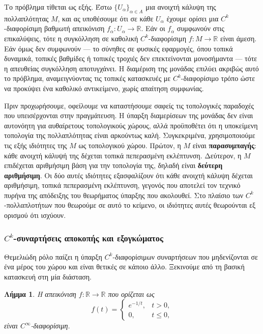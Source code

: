 \documentclass[11pt,a4paper,twoside,openright]{book}
\newtheorem{lemma}{Λήμμα}[section]
\begin{document}
Το πρόβλημα τίθεται ως εξής. Έστω $\{U_\alpha\}_{\alpha \in A}$ μια ανοιχτή κάλυψη της πολλαπλότητας $M$, και ας υποθέσουμε ότι σε κάθε $U_\alpha$ έχουμε ορίσει μια $C^k$-διαφορίσιμη βαθμωτή απεικόνιση $f_\alpha: U_\alpha \to \mathbb{R}$. Εάν οι $f_\alpha$ συμφωνούν στις επικαλύψεις, τότε η συγκόλληση σε καθολική $C^k$-διαφορίσιμη $f: M \to \mathbb{R}$ είναι άμεση. Εάν όμως δεν συμφωνούν --- το σύνηθες σε φυσικές εφαρμογές, όπου τοπικά δυναμικά, τοπικές βαθμίδες ή τοπικές τροχιές δεν επεκτείνονται μονοσήμαντα --- τότε η απευθείας συγκόλληση αποτυγχάνει. Η διαμέριση της μονάδας επιλύει ακριβώς αυτό το πρόβλημα, αναμειγνύοντας τις τοπικές κατασκευές με $C^k$-διαφορίσιμο τρόπο ώστε να προκύψει ένα καθολικό αντικείμενο, χωρίς απαίτηση συμφωνίας.

Πριν προχωρήσουμε, οφείλουμε να καταστήσουμε σαφείς τις τοπολογικές παραδοχές που υπεισέρχονται στην πραγμάτευση. Η ύπαρξη διαμερίσεων της μονάδας δεν είναι αυτονόητη για αυθαίρετους τοπολογικούς χώρους, αλλά προϋποθέτει ότι η υποκείμενη τοπολογία της πολλαπλότητας είναι αρκούντως καλή. Συγκεκριμένα, χρησιμοποιούμε τις εξής ιδιότητες της $M$ ως τοπολογικού χώρου. Πρώτον, η $M$ είναι \textbf{παρασυμπαγής}: κάθε ανοιχτή κάλυψή της δέχεται τοπικά πεπερασμένη εκλέπτυνση. Δεύτερον, η $M$ επιδέχεται αριθμήσιμη βάση για την τοπολογία της, δηλαδή είναι \textbf{δεύτερη αριθμήσιμη}. Οι δύο αυτές ιδιότητες εξασφαλίζουν ότι κάθε ανοιχτή κάλυψη δέχεται αριθμήσιμη, τοπικά πεπερασμένη εκλέπτυνση, γεγονός που αποτελεί τον τεχνικό πυρήνα της απόδειξης του θεωρήματος ύπαρξης που ακολουθεί. Στο πλαίσιο των $C^k$-πολλαπλοτήτων που θεωρούμε σε αυτό το κείμενο, οι ιδιότητες αυτές θεωρούνται εξ ορισμού ότι ισχύουν.

\subsubsection{$C^k$-συναρτήσεις αποκοπής και εξογκώματος}
	\label{sec:cutoff-and-bump-functions}

Θεμελιώδη ρόλο παίζει η ύπαρξη $C^k$-διαφορίσιμων συναρτήσεων που μηδενίζονται σε ένα μέρος του χώρου και είναι θετικές σε κάποιο άλλο. Ξεκινούμε από τη βασική κατασκευή στη μία διάσταση.

\begin{lemma}\label{lemma:smooth-exponential-cutoff}
Η απεικόνιση $f: \mathbb{R} \to \mathbb{R}$ που ορίζεται ως
\begin{equation*}
f(t) =
\begin{cases}
e^{-1/t}, & t > 0, \\
0, & t \le 0,
\end{cases}
\end{equation*}
είναι $C^\infty$-διαφορίσιμη.
\end{lemma}
\end{document}
